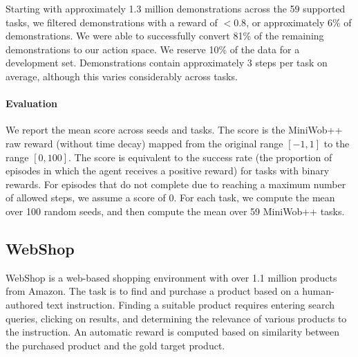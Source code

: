 Starting with approximately 1.3 million demonstrations across the 59 supported tasks, we filtered demonstrations with a reward of $<0.8$, or approximately 6\% of demonstrations. We were able to successfully convert 81\% of the remaining demonstrations to our action space. We reserve 10\% of the data for a development set. Demonstrations contain approximately 3 steps per task on average, although this varies considerably across tasks.

\paragraph{Evaluation}

We report the mean score across seeds and tasks. The score is the MiniWob++ raw reward (without time decay) mapped from the original range $[-1,1]$ to the range $[0,100]$.  The score is equivalent to the success rate (\ie the proportion of episodes in which the agent receives a positive reward) for tasks with binary rewards. For episodes that do not complete due to reaching a maximum number of allowed steps, we assume a score of $0$. For each task, we compute the mean over 100 random seeds, and then compute the mean over 59 MiniWob++ tasks.

\subsection{WebShop}

WebShop \citep{yao2022webshop} is a web-based shopping environment with over 1.1 million products from Amazon. The task is to find and purchase a product based on a human-authored text instruction. Finding a suitable product requires entering search queries, clicking on results, and determining the relevance of various products to the instruction. 
An automatic reward is computed based on similarity between the purchased product and the gold target product.

